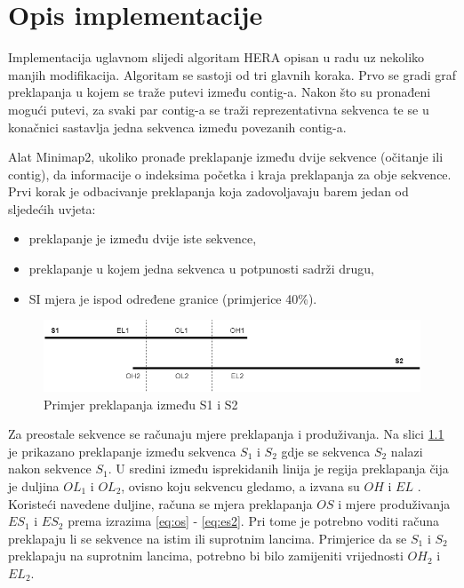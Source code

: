 \chapter{Opis implementacije}
Implementacija uglavnom slijedi algoritam HERA  opisan u radu \citep{Du345983} uz nekoliko manjih modifikacija. Algoritam se sastoji od tri glavnih koraka. Prvo se gradi graf preklapanja u kojem se traže putevi između contig-a. Nakon što su pronađeni mogući putevi, za svaki par contig-a se traži reprezentativna sekvenca te se u konačnici sastavlja jedna sekvenca između povezanih contig-a.

Alat Minimap2, ukoliko pronađe preklapanje između dvije sekvence (očitanje ili contig), da informacije o indeksima početka i kraja preklapanja za obje sekvence. Prvi korak je odbacivanje preklapanja koja zadovoljavaju barem jedan od sljedećih uvjeta:

\begin{itemize}
\item preklapanje je između dvije iste sekvence,
\item preklapanje u kojem jedna sekvenca u potpunosti sadrži drugu,
\item SI  mjera je ispod određene granice (primjerice 40\%).
\end{itemize}

\begin{figure}[htb]
\centering
\includegraphics[width=\textwidth]{img/overlap.png}
\caption{Primjer preklapanja između S1 i S2}
\label{fig:overlap}
\end{figure}

Za preostale sekvence se računaju mjere preklapanja i produživanja. Na slici \ref{fig:overlap} je prikazano preklapanje između sekvenca $S_1$ i $S_2$ gdje se sekvenca $S_2$ nalazi nakon sekvence $S_1$. U sredini između isprekidanih linija je regija preklapanja čija je duljina $OL_1$ i $OL_2$, ovisno koju sekvencu gledamo, a izvana su $OH$  i $EL$ . Koristeći navedene duljine, računa se mjera preklapanja $OS$ i mjere produživanja $ES_1$ i $ES_2$ prema izrazima \ref{eq:os} - \ref{eq:es2}. Pri tome je potrebno voditi računa preklapaju li se sekvence na istim ili suprotnim lancima. Primjerice da se $S_1$ i $S_2$ preklapaju na suprotnim lancima, potrebno bi bilo zamijeniti vrijednosti $OH_2$ i $EL_2$.

